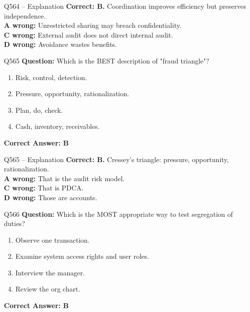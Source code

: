 \documentclass[aspectratio=169,10pt]{beamer}
\begin{document}
	\begin{frame}[t]{Q564 -- Explanation}
		\small
		\textbf{Correct: B.} Coordination improves efficiency but preserves independence. \\[4pt]
		\textbf{A wrong:} Unrestricted sharing may breach confidentiality. \\[2pt]
		\textbf{C wrong:} External audit does not direct internal audit. \\[2pt]
		\textbf{D wrong:} Avoidance wastes benefits.
	\end{frame}
	
	\begin{frame}[t]{Q565}
		\small
		\textbf{Question:} Which is the BEST description of "fraud triangle"?
		\begin{enumerate}[label=\Alph*.,itemsep=1pt,topsep=2pt]
			\item Risk, control, detection.
			\item Pressure, opportunity, rationalization.
			\item Plan, do, check.
			\item Cash, inventory, receivables.
		\end{enumerate}
		\vspace{4pt}
		\textbf{Correct Answer: B}
	\end{frame}
	
	\begin{frame}[t]{Q565 -- Explanation}
		\small
		\textbf{Correct: B.} Cressey's triangle: pressure, opportunity, rationalization. \\[4pt]
		\textbf{A wrong:} That is the audit risk model. \\[2pt]
		\textbf{C wrong:} That is PDCA. \\[2pt]
		\textbf{D wrong:} Those are accounts.
	\end{frame}
	
	\begin{frame}[t]{Q566}
		\small
		\textbf{Question:} Which is the MOST appropriate way to test segregation of duties?
		\begin{enumerate}[label=\Alph*.,itemsep=1pt,topsep=2pt]
			\item Observe one transaction.
			\item Examine system access rights and user roles.
			\item Interview the manager.
			\item Review the org chart.
		\end{enumerate}
		\vspace{4pt}
		\textbf{Correct Answer: B}
	\end{frame}
	
\end{document}
